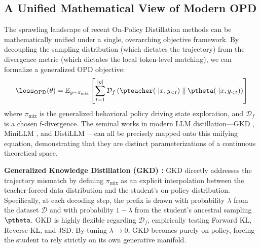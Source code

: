 \subsection{A Unified Mathematical View of Modern OPD}
\label{subsec:unified_view}

The sprawling landscape of recent On-Policy Distillation methods can be mathematically unified under a single, overarching objective framework. By decoupling the sampling distribution (which dictates the trajectory) from the divergence metric (which dictates the local token-level matching), we can formalize a generalized OPD objective:
\begin{equation}
    \loss_{\mathrm{OPD}}(\theta) = \mathbb{E}_{y \sim \pi_{\mathrm{mix}}} \left[ \sum_{t=1}^{|y|} \mathcal{D}_f \left( \pteacher(\cdot | x, y_{<t}) \parallel \ptheta(\cdot | x, y_{<t}) \right) \right]
\end{equation}
where $\pi_{\mathrm{mix}}$ is the generalized behavioral policy driving state exploration, and $\mathcal{D}_f$ is a chosen f-divergence. The seminal works in modern LLM distillation—GKD \citep{2306.13649}, MiniLLM \citep{2306.08543}, and DistiLLM \citep{2402.03898}—can all be precisely mapped onto this unifying equation, demonstrating that they are distinct parameterizations of a continuous theoretical space.

\textbf{Generalized Knowledge Distillation (GKD) \citep{2306.13649}:} GKD directly addresses the trajectory mismatch by defining $\pi_{\mathrm{mix}}$ as an explicit interpolation between the teacher-forced data distribution and the student's on-policy distribution. Specifically, at each decoding step, the prefix is drawn with probability $\lambda$ from the dataset $\mathcal{D}$ and with probability $1-\lambda$ from the student's ancestral sampling $\ptheta$. GKD is highly flexible regarding $\mathcal{D}_f$, empirically testing Forward KL, Reverse KL, and JSD. By tuning $\lambda \to 0$, GKD becomes purely on-policy, forcing the student to rely strictly on its own generative manifold.

